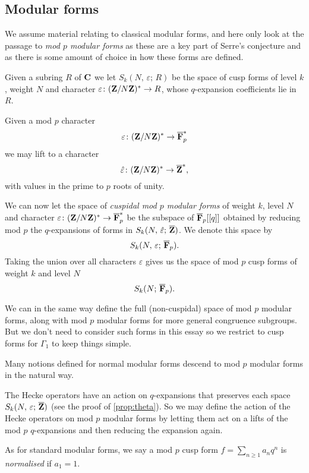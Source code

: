 \documentclass[a4paper,12pt]{article}
\begin{document}
\subsection{Modular forms}
We assume material relating to classical modular forms, and here only look at the passage to \emph{mod $p$ modular forms} as these are a key part of Serre's conjecture and as there is some amount of choice in how these forms are defined.

\begin{defn}
Given a subring $R$ of $\mathbf{C}$ we let $S_k(N,\,\varepsilon;\,R)$ be the space of cusp forms of level $k$, weight $N$ and character $\varepsilon\colon (\mathbf{Z}/N\mathbf{Z})^* \to R$, whose $q$-expansion coefficients lie in $R$.

Given a mod $p$ character
\[
\varepsilon\colon (\mathbf{Z}/N\mathbf{Z})^* \to \overline{\mathbf{F}}_p^*
\]
we may lift to a character %
\[
\hat{\varepsilon}\colon (\mathbf{Z}/N\mathbf{Z})^* \to \overline{\mathbf{Z}}^*,
\]
with values in the prime to $p$ roots of unity.

We can now let the space of \emph{cuspidal mod $p$ modular forms} of weight $k$, level $N$ and character $\varepsilon\colon (\mathbf{Z}/N\mathbf{Z})^* \to \overline{\mathbf{F}}_p^*$ be the subspace of $\overline{\mathbf{F}}_p[[q]]$ obtained by reducing mod $p$ the $q$-expansions of forms in $S_k(N,\,\hat{\varepsilon};\,\overline{\mathbf{Z}})$.
We denote this space by
\[
S_k(N,\,\varepsilon;\,\overline{\mathbf{F}}_p).
\]
Taking the union over all characters $\varepsilon$ gives us the space of mod $p$ cusp forms of weight $k$ and level $N$
\[
S_k(N;\,\overline{\mathbf{F}}_p).
\]

We can in the same way define the full (non-cuspidal) space of mod $p$ modular forms, along with mod $p$ modular forms for more general congruence subgroups.
But we don't need to consider such forms in this essay so we restrict to cusp forms for $\Gamma_1$ to keep things simple.
\end{defn}

Many notions defined for normal modular forms descend to mod $p$ modular forms in the natural way.

\begin{defn}
The Hecke operators have an action on $q$-expansions that preserves each space $S_k(N,\,\varepsilon;\,\overline{\mathbf{Z}})$ (see the proof of \cref{prop:theta}).
So we may define the action of the Hecke operators on mod $p$ modular forms by letting them act on a lifts of the mod $p$ $q$-expansions and then reducing the expansion again.
\end{defn}

\begin{defn}
As for standard modular forms, we say a mod $p$ cusp form $f = \sum_{n\ge 1} a_n q^n$
is \emph{normalised} if $a_1 = 1$.
\end{defn}
\end{document}
